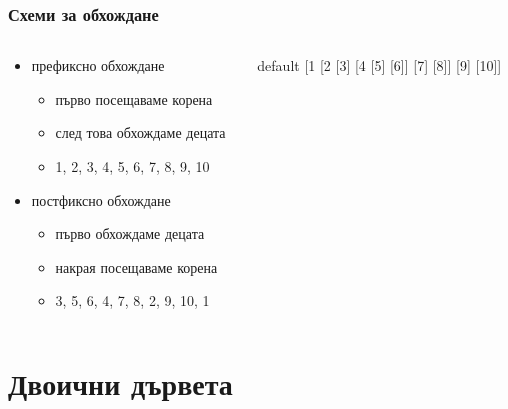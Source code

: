 \documentclass[alsotrans]{beamerswitch}
\newcommand{\sampletree}{%
  \begin{forest} default
    [1 [2 [3] [4 [5] [6]] [7] [8]] [9] [10]]
  \end{forest}%
}
\begin{document}
\begin{frame}
  \frametitle{Схеми за обхождане}
  \begin{columns}[c]
    \begin{column}{0.65\textwidth}
      \begin{itemize}
      \item префиксно обхождане
        \begin{itemize}
        \item първо посещаваме корена
        \item след това обхождаме децата
          \pause
        \item 1, 2, 3, 4, 5, 6, 7, 8, 9, 10
        \end{itemize}
        \pause
      \item постфиксно обхождане
        \begin{itemize}
        \item първо обхождаме децата
        \item накрая посещаваме корена
          \pause
        \item 3, 5, 6, 4, 7, 8, 2, 9, 10, 1
        \end{itemize}
      \end{itemize}
    \end{column}
    \begin{column}{0.35\textwidth}
      \begin{center}
        \sampletree
      \end{center}
    \end{column}
  \end{columns}
\end{frame}

\section{Двоични дървета}
\end{document}
